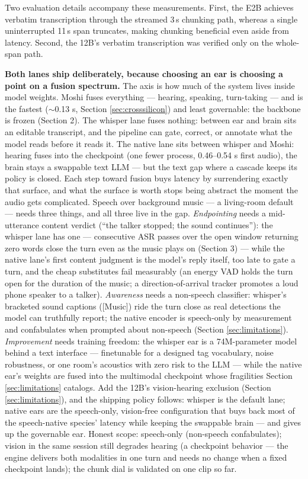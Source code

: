 \documentclass{article}
\begin{document}
Two evaluation details accompany these measurements. First, the E2B achieves
verbatim transcription through the streamed 3\,s chunking path, whereas a
single uninterrupted 11\,s span truncates, making chunking beneficial even
aside from latency. Second, the 12B's verbatim transcription was verified only
on the whole-span path.

\textbf{Both lanes ship deliberately, because choosing an ear is choosing a
point on a fusion spectrum.} The axis is how much of the system lives inside
model weights. Moshi fuses everything --- hearing, speaking, turn-taking --- and
is the fastest ($\sim$0.13 s, Section \ref{sec:crosssilicon}) and least
governable: the backbone is frozen (Section 2). The whisper lane fuses
nothing: between ear and brain sits an editable transcript, and the pipeline
can gate, correct, or annotate what the model reads before it reads it. The
native lane sits between whisper and Moshi: hearing fuses into the checkpoint
(one fewer process, 0.46--0.54 s first audio), the brain stays a swappable
text LLM --- but the text gap where a cascade keeps its policy is closed. Each
step toward fusion buys latency by surrendering exactly that surface, and
what the surface is worth stops being abstract the moment the audio gets
complicated. Speech over background music --- a living-room default --- needs
three things, and all three live in the gap. \textit{Endpointing} needs a
mid-utterance content verdict (``the talker stopped; the sound continues''):
the whisper lane has one --- consecutive ASR passes over the open window
returning zero words close the turn even as the music plays on (Section 3) ---
while the native lane's first content judgment is the model's reply itself,
too late to gate a turn, and the cheap substitutes fail measurably (an energy
VAD holds the turn open for the duration of the music; a direction-of-arrival
tracker promotes a loud phone speaker to a talker). \textit{Awareness} needs
a non-speech classifier: whisper's bracketed sound captions ([Music]) ride
the turn close as real detections the model can truthfully report; the native
encoder is speech-only by measurement and confabulates when prompted about
non-speech (Section \ref{sec:limitations}). \textit{Improvement} needs
training freedom: the whisper ear is a 74M-parameter model behind a text
interface --- finetunable for a designed tag vocabulary, noise robustness, or
one room's acoustics with zero risk to the LLM --- while the native ear's
weights are fused into the multimodal checkpoint whose fragilities
Section \ref{sec:limitations} catalogs. Add the 12B's vision-hearing
exclusion (Section \ref{sec:limitations}), and the shipping policy follows:
whisper is the default lane; native ears are the speech-only, vision-free
configuration that buys back most of the speech-native species' latency
while keeping the swappable brain --- and gives up the governable ear. Honest
scope: speech-only (non-speech confabulates); vision in the same session
still degrades hearing (a checkpoint behavior --- the engine delivers both
modalities in one turn and needs no change when a fixed checkpoint lands);
the chunk dial is validated on one clip so far.
\end{document}
